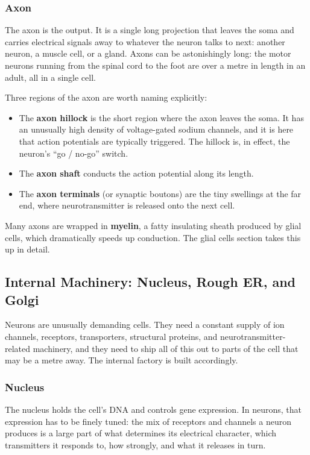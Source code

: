 \documentclass[11pt]{article}
\begin{document}
\subsubsection{Axon}

The axon is the output. It is a single long projection that leaves the soma and carries electrical signals away to whatever the neuron talks to next: another neuron, a muscle cell, or a gland. Axons can be astonishingly long: the motor neurons running from the spinal cord to the foot are over a metre in length in an adult, all in a single cell.

Three regions of the axon are worth naming explicitly:

\begin{itemize}
    \item The \textbf{axon hillock} is the short region where the axon leaves the soma. It has an unusually high density of voltage-gated sodium channels, and it is here that action potentials are typically triggered. The hillock is, in effect, the neuron's ``go / no-go'' switch.
    \item The \textbf{axon shaft} conducts the action potential along its length.
    \item The \textbf{axon terminals} (or synaptic boutons) are the tiny swellings at the far end, where neurotransmitter is released onto the next cell.
\end{itemize}

Many axons are wrapped in \textbf{myelin}, a fatty insulating sheath produced by glial cells, which dramatically speeds up conduction. The glial cells section takes this up in detail.

\subsection{Internal Machinery: Nucleus, Rough ER, and Golgi}

Neurons are unusually demanding cells. They need a constant supply of ion channels, receptors, transporters, structural proteins, and neurotransmitter-related machinery, and they need to ship all of this out to parts of the cell that may be a metre away. The internal factory is built accordingly.

\subsubsection{Nucleus}

The nucleus holds the cell's DNA and controls gene expression. In neurons, that expression has to be finely tuned: the mix of receptors and channels a neuron produces is a large part of what determines its electrical character, which transmitters it responds to, how strongly, and what it releases in turn.
\end{document}
